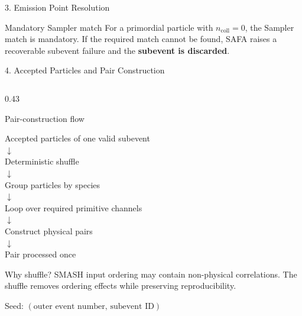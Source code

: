 \documentclass{beamer}
\begin{document}
\begin{frame}{3. Emission Point Resolution}
\vspace{-0.2em}
\begin{center}
\qquad
{}
\qquad
{}
\end{center}

\vspace{-0.2em}
\begin{alertblock}{Mandatory Sampler match}
For a primordial particle with $n_{\mathrm{coll}}=0$, the Sampler match is mandatory. If the required match cannot be found, SAFA raises a recoverable subevent failure and the \textbf{subevent is discarded}.
\end{alertblock}

\end{frame}


\begin{frame}{4. Accepted Particles and Pair Construction}
\fontsize{7.1}{8.0}\selectfont

\begin{columns}[T]

\begin{column}{0.43\textwidth}
\begin{block}{Pair-construction flow}
\begin{center}
Accepted particles of one valid subevent\\[-0.15em]
$\downarrow$\\[-0.15em]
Deterministic shuffle\\[-0.15em]
$\downarrow$\\[-0.15em]
Group particles by species\\[-0.15em]
$\downarrow$\\[-0.15em]
Loop over required primitive channels\\[-0.15em]
$\downarrow$\\[-0.15em]
Construct physical pairs\\[-0.15em]
$\downarrow$\\[-0.15em]
Pair processed once
\end{center}
\end{block}

\vspace{-0.25em}
\begin{alertblock}{Why shuffle?}
SMASH input ordering may contain non-physical correlations. The shuffle removes ordering effects while preserving reproducibility.

\smallskip
Seed: $(\text{outer event number},\,\text{subevent ID})$
\end{alertblock}
\end{column}


\end{columns}
\end{frame}
\end{document}
